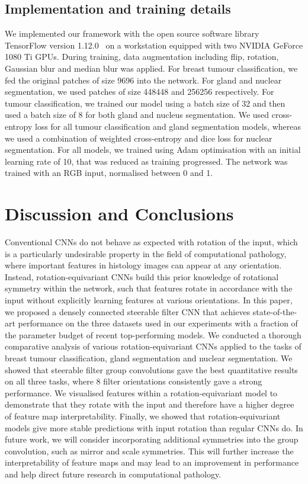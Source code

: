 \documentclass[journal]{IEEEtran}
\begin{document}
	    
	\subsection{Implementation and training details} \label{section:implementation}
	We implemented our framework with the open source software library TensorFlow version 1.12.0~\cite{abadi2016tensorflow} on a workstation equipped with two NVIDIA GeForce 1080 Ti GPUs. During training, data augmentation including flip, rotation, Gaussian blur and median blur was applied. For breast tumour classification, we fed the original patches of size 9696 into the network. For gland and nuclear segmentation, we used patches of size 448448 and 256256 respectively. For tumour classification, we trained our model using a batch size of 32 and then used a batch size of 8 for both gland and nucleus segmentation. We used cross-entropy loss for all tumour classification and gland segmentation models, whereas we used a combination of weighted cross-entropy and dice loss for nuclear segmentation. For all models, we trained using Adam optimisation with an initial learning rate of 10, that was reduced as training progressed. The network was trained with an RGB input, normalised between 0 and 1.

	

\section{Discussion and Conclusions}

Conventional CNNs do not behave as expected with rotation of the input, which is a particularly undesirable property in the field of computational pathology, where important features in histology images can appear at any orientation. Instead, rotation-equivariant CNNs build this prior knowledge of rotational symmetry within the network, such that features rotate in accordance with the input without explicitly learning features at various orientations. In this paper, we proposed a densely connected steerable filter CNN that achieves state-of-the-art performance on the three datasets used in our experiments with a fraction of the parameter budget of recent top-performing models. We conducted a thorough comparative analysis of various rotation-equivariant CNNs applied to the tasks of breast tumour classification, gland segmentation and nuclear segmentation. We showed that steerable filter group convolutions gave the best quantitative results on all three tasks, where 8 filter orientations consistently gave a strong performance. We visualised features within a rotation-equivariant model to demonstrate that they rotate with the input and therefore have a higher degree of feature map interpretability. Finally, we showed that rotation-equivariant models give more stable predictions with input rotation than regular CNNs do. In future work, we will consider incorporating additional symmetries into the group convolution, such as mirror and scale symmetries. This will further increase the interpretability of feature maps and may lead to an improvement in performance and help direct future research in computational pathology.
	
\end{document}
